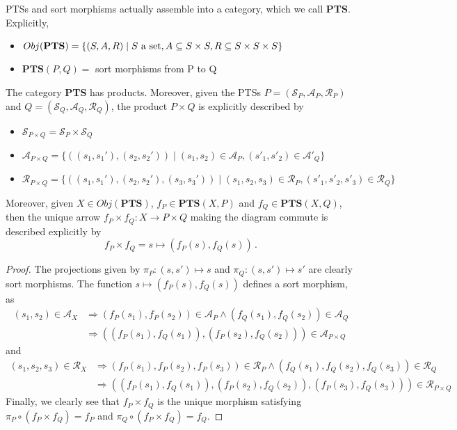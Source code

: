 \documentclass[]{template}
\begin{document}
PTSs and sort morphisms actually assemble into a category, which we call \textbf{PTS}. Explicitly,

\begin{itemize}
\item $ Obj(\text{\textbf{PTS}}) = \{ (S, A, R) \mid S \text{ a set}, A \subseteq S \times S, R \subseteq S \times S \times S\} $
\item $ \textbf{PTS}(P, Q) = $ sort morphisms from P to Q
\end{itemize}

\begin{thm}[]
  The category \textbf{PTS} has products. Moreover, given the PTSs $ P=(\mathcal{S}_P,\mathcal{A}_P,\mathcal{R}_P)$ and $ Q=(\mathcal{S}_Q,\mathcal{A}_Q,\mathcal{R}_Q)$, the product $ P \times Q $ is explicitly described by
  \begin{itemize}
  \item $ \mathcal{S}_{P \times Q} = \mathcal{S}_P \times \mathcal{S}_Q $
  \item $ \mathcal{A}_{P \times Q} = \{ ((s_1, s_1'), (s_2, s_2')) \mid (s_1, s_2) \in \mathcal{A}_P, (s'_1, s'_2) \in \mathcal{A}'_Q \}$
  \item $ \mathcal{R}_{P \times Q} = \{((s_1, s_1'), (s_2, s_2'), (s_3, s_3')) \mid (s_1, s_2, s_3) \in \mathcal{R}_P, (s'_1, s'_2, s'_3) \in \mathcal{R}_Q \}$
  \end{itemize}
  Moreover, given $ X \in Obj(\textbf{PTS}) $, $ f_P \in \textbf{PTS}(X, P) $ and $ f_Q \in \textbf{PTS}(X, Q) $, then the unique arrow $ f_P \times f_Q : X \to P \times Q $ making the diagram commute is described explicitly by \[
f_P \times f_Q = s \mapsto (f_P (s), f_Q (s))
    \,.\] 
\end{thm}
\begin{proof}
  The projections given by $ \pi_P : (s, s') \mapsto s $ and $ \pi_Q : (s, s') \mapsto s' $ are clearly sort morphisms. The function $ s \mapsto (f_P (s), f_Q (s)) $ defines a sort morphism, as
  \begin{align*}
    (s_1, s_2) \in \mathcal{A}_X &\Rightarrow (f_P(s_1), f_P(s_2)) \in \mathcal{A}_P \land (f_Q(s_1), f_Q(s_2)) \in \mathcal{A}_Q \\ &\Rightarrow ((f_P(s_1), f_Q(s_1)), (f_P(s_2), f_Q(s_2))) \in \mathcal{A}_{P \times Q}\end{align*}
  and
  \begin{align*}
    (s_1, s_2, s_3) \in \mathcal{R}_X &\Rightarrow (f_P(s_1), f_P(s_2), f_P(s_3)) \in \mathcal{R}_P \land (f_Q(s_1), f_Q(s_2), f_Q(s_3)) \in \mathcal{R}_Q \\ &\Rightarrow ((f_P(s_1), f_Q(s_1)), (f_P(s_2), f_Q(s_2)), (f_P(s_3), f_Q(s_3)))  \in \mathcal{R}_{P \times Q}
  \end{align*}
  Finally, we clearly see that $ f_P \times f_Q $ is the unique morphism satisfying $ \pi_P \circ (f_P \times f_Q) = f_P $ and $ \pi_Q \circ (f_P \times f_Q) = f_Q $.
\end{proof}
\end{document}
